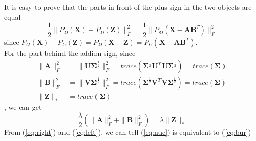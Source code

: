 \documentclass[11pt]{article}
\newcommand{\mtx}[1]{\mathbf{#1}}
\def \mA {\mtx{A}}
\def \mB {\mtx{B}}
\def \mU {\mtx{U}}
\def \mV {\mtx{V}}
\def \mSigma {\mtx{\Sigma}}
\def \mX {\mtx{X}}
\def \mZ {\mtx{Z}}
\begin{document}
\subsection{}
It is easy to prove that the parts in front of the plus sign in the two objects are equal  
\begin{equation}\label{eq:right}
	\frac{1}{2}\|P_\Omega(\mX)-P_\Omega(\mZ)\|_F^2 = \frac{1}{2}\|P_\Omega(\mX-\mA\mB^T)\|_F^2
\end{equation}
since $P_\Omega(\mX)-P_\Omega(\mZ) = P_\Omega(\mX-\mZ) =P_\Omega(\mX-\mA\mB^T)$.\\
For the part behind the addion sign, since
\begin{align*}
	\|\mA\|_F^2 &= \|\mU\mSigma^\frac{1}{2}\|_F^2 = trace(\mSigma^\frac{1}{2}\mU^T\mU\mSigma^\frac{1}{2}) = trace(\mSigma)\\
	\|\mB\|_F^2 &= \|\mV\mSigma^\frac{1}{2}\|_F^2 = trace(\mSigma^\frac{1}{2}\mV^T\mV\mSigma^\frac{1}{2}) = trace(\mSigma)\\
	\|\mZ\|_* &= trace(\mSigma)
\end{align*},
we can get \
\begin{equation}\label{eq:left}
	\frac{\lambda}{2}(\|\mA\|_F^2+\|\mB\|^2_F) = \lambda\|\mZ\|_*
\end{equation}
From (\ref{eq:right}) and (\ref{eq:left}), we can tell (\ref{eq:nuc}) is equivalent to (\ref{eq:bur})
\subsection{}
\end{document}
